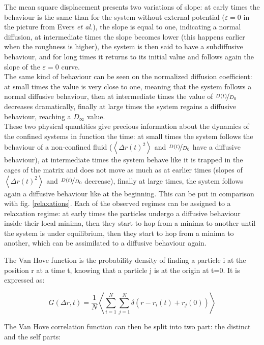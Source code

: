 \documentclass[a4paper,12pt]{article}
\newcommand{\jline}{\vspace{10pt}}
\newcommand{\etal}{\textit{et al.}}
\begin{document}
The mean square displacement presents two variations of slope: at early times the behaviour is the same than for the system without external
potential ($\varepsilon = 0$ in the picture from Evers \etal), the slope is equal to one, indicating a normal diffusion, at intermediate 
times the slope becomes lower (this happens earlier when the roughness is higher), the system is then said to have a subdiffusive behaviour,
and for long times it returns to its initial value and follows again the slope of the $\varepsilon = 0$ curve.\\
The same kind of behaviour can be seen on the normalized diffusion coefficient: at small times the value is very close to one, meaning that
the system follows a normal diffusive behaviour, then at intermediate times the value of $\nicefrac{D(t)}{D_0}$ decreases dramatically, 
finally at large times the system regains a diffusive behaviour, reaching a $D_{\infty}$ value.\\
These two physical quantities give precious information about the dynamics of the confined systems in function the time: at small times the
system follows the behaviour of a non-confined fluid ($\left< \Delta r(t)^2\right>$ and $\nicefrac{D(t)}{D_0}$ have a diffusive behaviour),
at intermediate times the system behave like it is trapped in the cages of the matrix and does not move as much as at earlier times (slopes
of $\left< \Delta r(t)^2\right>$ and $\nicefrac{D(t)}{D_0}$ decrease), finally at large times, the system follows again a diffusive 
behaviour like at the beginning. This can be put in comparison with fig. \ref{relaxations}. Each of the observed regimes can be assigned to
a relaxation regime: at early times the particles undergo a diffusive behaviour inside their local minima, then they start to hop from a
minima to another until the system is under equilibrium, then they start to hop from a minima to another, which can be assimilated to a
diffusive behaviour again.\jline

The Van Hove function is the probability density of finding a particle i at the position r at a time t, knowing that a particle j is at 
the origin at t=0. It is expressed as:

\begin{equation}
G(\Delta r,t) = \frac{1}{N} \left< \sum_{i=1}^N \sum_{j=1}^N \delta(r-r_i(t)+r_j(0)) \right>
\end{equation}

The Van Hove correlation function can then be split into two part: the distinct and the self parts:
\end{document}
